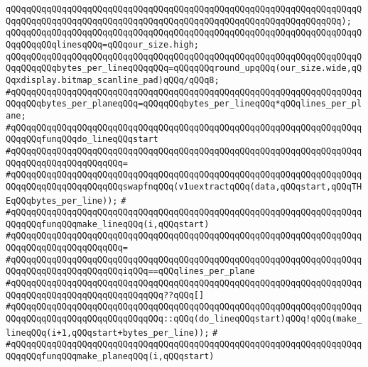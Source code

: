 \verb|qQQqqQQqqQQqqQQqqQQqqQQqqQQqqQQqqQQqqQQqqQQqqQQqqQQqqQQqqQQqqQQqqQQqqQQqqQQqqQQqqQQqqQQqqQQqqQQqqQQqqQQqqQQqqQQqqQQqqQQqqQQqqQQqqQQqqQQq);|\newline
\newline
\verb|qQQqqQQqqQQqqQQqqQQqqQQqqQQqqQQqqQQqqQQqqQQqqQQqqQQqqQQqqQQqqQQqqQQqqQQqqQQqqQQqlinesqQQq=qQQqour_size.high;|\newline
\newline
\verb|qQQqqQQqqQQqqQQqqQQqqQQqqQQqqQQqqQQqqQQqqQQqqQQqqQQqqQQqqQQqqQQqqQQqqQQqqQQqqQQqbytes_per_lineqQQqqQQq=qQQqqQQqround_upqQQq(our_size.wide,qQQqxdisplay.bitmap_scanline_pad)qQQq/qQQq8;|\newline
\verb|#qQQqqQQqqQQqqQQqqQQqqQQqqQQqqQQqqQQqqQQqqQQqqQQqqQQqqQQqqQQqqQQqqQQqqQQqqQQqbytes_per_planeqQQq=qQQqqQQqbytes_per_lineqQQq*qQQqlines_per_plane;|\newline
\newline
\verb|#qQQqqQQqqQQqqQQqqQQqqQQqqQQqqQQqqQQqqQQqqQQqqQQqqQQqqQQqqQQqqQQqqQQqqQQqqQQqfunqQQqdo_lineqQQqstart|\newline
\verb|#qQQqqQQqqQQqqQQqqQQqqQQqqQQqqQQqqQQqqQQqqQQqqQQqqQQqqQQqqQQqqQQqqQQqqQQqqQQqqQQqqQQqqQQqqQQq=|\newline
\verb|#qQQqqQQqqQQqqQQqqQQqqQQqqQQqqQQqqQQqqQQqqQQqqQQqqQQqqQQqqQQqqQQqqQQqqQQqqQQqqQQqqQQqqQQqqQQqswapfnqQQq(v1uextractqQQq(data,qQQqstart,qQQqTHEqQQqbytes_per_line));|\newline
\verb|#|\newline
\verb|#qQQqqQQqqQQqqQQqqQQqqQQqqQQqqQQqqQQqqQQqqQQqqQQqqQQqqQQqqQQqqQQqqQQqqQQqqQQqfunqQQqmake_lineqQQq(i,qQQqstart)|\newline
\verb|#qQQqqQQqqQQqqQQqqQQqqQQqqQQqqQQqqQQqqQQqqQQqqQQqqQQqqQQqqQQqqQQqqQQqqQQqqQQqqQQqqQQqqQQqqQQq=|\newline
\verb|#qQQqqQQqqQQqqQQqqQQqqQQqqQQqqQQqqQQqqQQqqQQqqQQqqQQqqQQqqQQqqQQqqQQqqQQqqQQqqQQqqQQqqQQqqQQqiqQQq==qQQqlines_per_plane|\newline
\verb|#qQQqqQQqqQQqqQQqqQQqqQQqqQQqqQQqqQQqqQQqqQQqqQQqqQQqqQQqqQQqqQQqqQQqqQQqqQQqqQQqqQQqqQQqqQQqqQQqqQQq??qQQq[]|\newline
\verb|#qQQqqQQqqQQqqQQqqQQqqQQqqQQqqQQqqQQqqQQqqQQqqQQqqQQqqQQqqQQqqQQqqQQqqQQqqQQqqQQqqQQqqQQqqQQqqQQqqQQq::qQQq(do_lineqQQqstart)qQQq!qQQq(make_lineqQQq(i+1,qQQqstart+bytes_per_line));|\newline
\verb|#|\newline
\verb|#qQQqqQQqqQQqqQQqqQQqqQQqqQQqqQQqqQQqqQQqqQQqqQQqqQQqqQQqqQQqqQQqqQQqqQQqqQQqfunqQQqmake_planeqQQq(i,qQQqstart)|\newline
